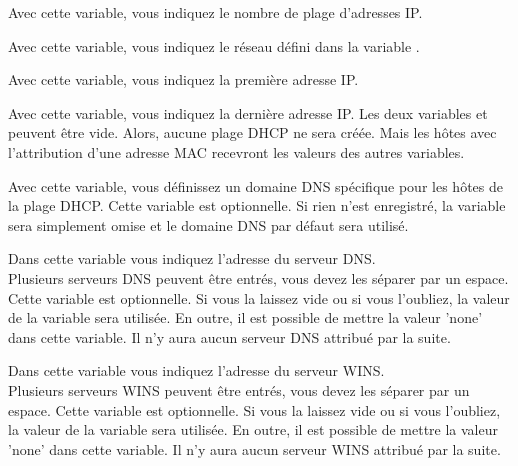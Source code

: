 \begin{description}

    {Avec cette variable, vous indiquez le nombre de plage d'adresses IP.}


    {Avec cette variable, vous indiquez le réseau défini dans la variable
	.}


    {Avec cette variable, vous indiquez la première adresse IP.}


    {Avec cette variable, vous indiquez la dernière adresse IP. Les deux
	variables  et  peuvent être
    vide. Alors, aucune plage DHCP ne sera créée. Mais les hôtes avec l'attribution
    d'une adresse MAC recevront les valeurs des autres variables.}


    {Avec cette variable, vous définissez un domaine DNS spécifique pour les hôtes
    de la plage DHCP. Cette variable est optionnelle. Si rien n'est enregistré,
    la variable sera simplement omise et le domaine DNS par défaut 
    sera utilisé.}


    {Dans cette variable vous indiquez l'adresse du serveur DNS. \\
	Plusieurs serveurs DNS peuvent être entrés, vous devez les séparer par un espace.
	Cette variable est optionnelle. Si vous la laissez vide ou si vous l'oubliez, la valeur
	de la variable  sera utilisée.
	En outre, il est possible de mettre la valeur 'none' dans cette variable. Il n'y
	aura aucun serveur DNS attribué par la suite.}


    {Dans cette variable vous indiquez l'adresse du serveur WINS. \\
	Plusieurs serveurs WINS peuvent être entrés, vous devez les séparer par un espace.
	Cette variable est optionnelle. Si vous la laissez vide ou si vous l'oubliez, la valeur
	de la variable  sera utilisée.
	En outre, il est possible de mettre la valeur 'none' dans cette variable. Il n'y
	aura aucun serveur WINS attribué par la suite.}


\end{description}
